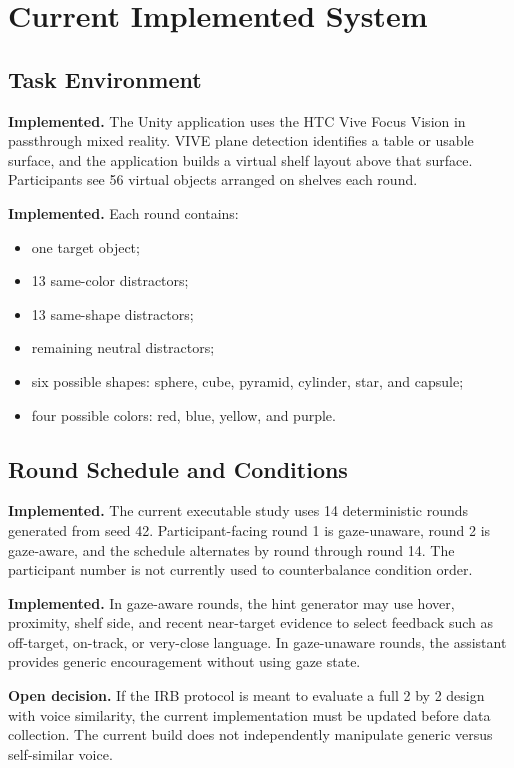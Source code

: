 \documentclass[11pt,letterpaper]{article}
\newcommand{\status}[1]{\textbf{#1.}}
\begin{document}
\section{Current Implemented System}

\subsection{Task Environment}

\status{Implemented} The Unity application uses the HTC Vive Focus Vision in passthrough mixed reality. VIVE plane detection identifies a table or usable surface, and the application builds a virtual shelf layout above that surface. Participants see 56 virtual objects arranged on shelves each round.

\status{Implemented} Each round contains:
\begin{itemize}
  \item one target object;
  \item 13 same-color distractors;
  \item 13 same-shape distractors;
  \item remaining neutral distractors;
  \item six possible shapes: sphere, cube, pyramid, cylinder, star, and capsule;
  \item four possible colors: red, blue, yellow, and purple.
\end{itemize}

\subsection{Round Schedule and Conditions}

\status{Implemented} The current executable study uses 14 deterministic rounds generated from seed 42. Participant-facing round 1 is gaze-unaware, round 2 is gaze-aware, and the schedule alternates by round through round 14. The participant number is not currently used to counterbalance condition order.

\status{Implemented} In gaze-aware rounds, the hint generator may use hover, proximity, shelf side, and recent near-target evidence to select feedback such as off-target, on-track, or very-close language. In gaze-unaware rounds, the assistant provides generic encouragement without using gaze state.

\status{Open decision} If the IRB protocol is meant to evaluate a full 2 by 2 design with voice similarity, the current implementation must be updated before data collection. The current build does not independently manipulate generic versus self-similar voice.
\end{document}

